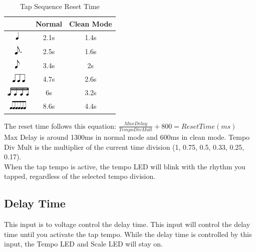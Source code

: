 \documentclass[a4paper, 10pt]{article}
\begin{document}
\begin{table}[h!]
\centering
\begin{tabular}{|c|c|c|}
\hline
\rowcolor{lightgray}{\Large\textbf{Time Division Selected}} & {\Large\textbf{Normal}} & {\Large\textbf{Clean Mode}}\\
\hline
\includegraphics[scale=1.2]{fourth} & 2.1s & 1.4s\\
\hline
\includegraphics[scale=1.2]{dotted-eight} & 2.5s & 1.6s\\
\hline
\includegraphics[scale=1.2]{eight} & 3.4s & 2s\\
\hline
\includegraphics[scale=1.2]{triplet} & 4.7s & 2.6s\\
\hline
\includegraphics[scale=1.2]{sixteenth} & 6s & 3.2s\\
\hline
\includegraphics[scale=1.2]{sextuplet} & 8.6s & 4.4s\\
\hline
\end{tabular}
\caption{Tap Sequence Reset Time}
\end{table}

The reset time follows this equation: $\frac{Max Delay}{Tempo Div Mult} + 800 = Reset Time (ms)$\\

Max Delay is around 1300ms in normal mode and 600ms in clean mode. Tempo Div Mult is the multiplier of the current time division (1, 0.75, 0.5, 0.33, 0.25, 0.17).\\

When the tap tempo is active, the tempo LED will blink with the rhythm you tapped, regardless of the selected tempo division.\\

\subsection{Delay Time}
\label{subsec:delaytime}
\bigbreak
This input is to voltage control the delay time. This input will control the delay time until you activate the tap tempo. While the delay time is controlled by this input, the Tempo LED and Scale LED will stay on.\\
\end{document}
